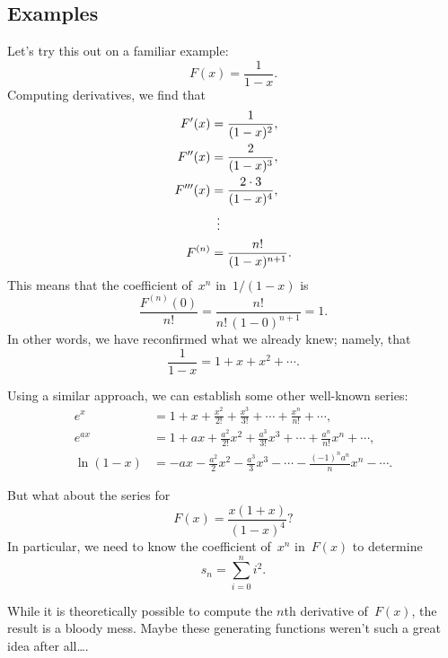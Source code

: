 \subsection{Examples}

Let's try this out on a familiar example:
\begin{equation*}
    F(x) = \frac{1}{1 - x}.
\end{equation*}
Computing derivatives, we find that
\begin{align*}
F'(x)   & = \frac{1}{(1 - x)^2}, \\
F''(x)  & = \frac{2}{(1 - x)^3}, \\
F'''(x) & = \frac{2 \cdot 3}{(1 - x)^4}, \\
        & \enskip\vdots \\
F^{(n)} & = \frac{n!}{(1 - x)^{n + 1}}. 
\end{align*}
This means that the coefficient of~$x^n$ in~$1/(1 - x)$ is
\begin{equation*}
\frac{F^{(n)}(0)}{n!}
    = \frac{n!}{n!\, (1 - 0)^{n + 1}}
    = 1.
\end{equation*}
In other words, we have reconfirmed what we already knew; namely, that
\begin{equation*}
    \frac{1}{1 - x} = 1 + x + x^2 + \cdots.
\end{equation*}

Using a similar approach, we can establish some other well-known
series:
\begingroup
{}
\begin{align*}
e^x
    &= 1 + x + \frac{x^2}{2!} + \frac{x^3}{3!} + \cdots +
        \frac{x^n}{n!} + \cdots, \\
%
e^{ax}
    &= 1 + ax + \frac{a^2}{2!} x^2 + \frac{a^3}{3!} x^3 + \cdots +
        \frac{a^n}{n!} x^n + \cdots, \\
%
\ln(1 - x)
    &= -a x - \frac{a^2}{2} x^2 - \frac{a^3}{3} x^3 - \cdots 
        - \frac{(-1)^n a^n}{n} x^n - \cdots.
\end{align*}
\endgroup

But what about the series for
\begin{equation}\label{eqn:12D}
    F(x) = \frac{x (1 + x)}{(1 - x)^4} ?
\end{equation}
In particular, we need to know the coefficient of~$x^n$ in~$F(x)$ to
determine
\begin{equation*}
    s_n = \sum_{i = 0}^n i^2.
\end{equation*}

While it is theoretically possible to compute the $n$th derivative
of~$F(x)$, the result is a bloody mess.  Maybe these generating
functions weren't such a great idea after all\dots.

